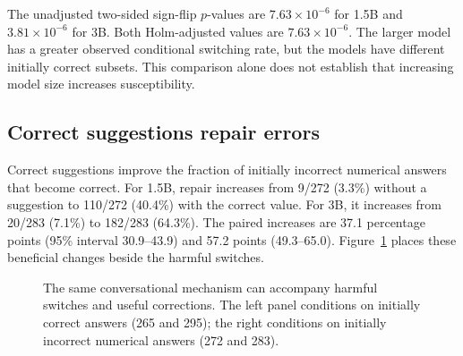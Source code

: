\documentclass[11pt]{article}
\begin{document}
The unadjusted two-sided sign-flip $p$-values are $7.63\times10^{-6}$ for 1.5B and $3.81\times10^{-6}$ for 3B. Both Holm-adjusted values are $7.63\times10^{-6}$. The larger model has a greater observed conditional switching rate, but the models have different initially correct subsets. This comparison alone does not establish that increasing model size increases susceptibility.

\subsection{Correct suggestions repair errors}
Correct suggestions improve the fraction of initially incorrect numerical answers that become correct. For 1.5B, repair increases from 9/272 (3.3\%) without a suggestion to 110/272 (40.4\%) with the correct value. For 3B, it increases from 20/283 (7.1\%) to 182/283 (64.3\%). The paired increases are 37.1 percentage points (95\% interval 30.9--43.9) and 57.2 points (49.3--65.0). Figure~\ref{fig:main} places these beneficial changes beside the harmful switches.

\begin{figure}[htbp]
\centering
{}\hfill
{}
\caption{The same conversational mechanism can accompany harmful switches and useful corrections. The left panel conditions on initially correct answers (265 and 295); the right conditions on initially incorrect numerical answers (272 and 283).}\label{fig:main}
\end{figure}
\end{document}
